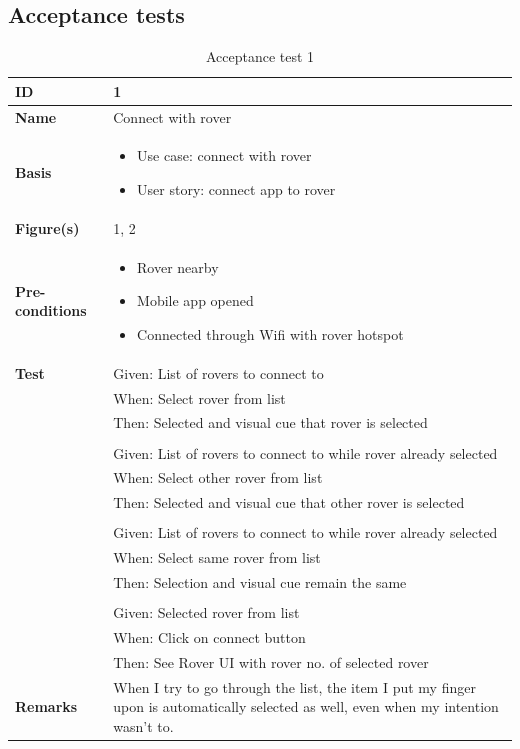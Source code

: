 \documentclass[12pt]{article}
\begin{document}
	\subsection{Acceptance tests}
	\begin{table}[H]
		\centering
		\begin{tabularx}{\linewidth}{|X|X|}
			\hline
			\textbf{ID} &1\\
			\hline
			\textbf{Name} &Connect with rover\\
			\hline
			\textbf{Basis} &\begin{itemize}
								\item Use case: connect with rover
								\item User story: connect app to rover
							\end{itemize}\\
			\hline
			\textbf{Figure(s)} &1, 2 \\
			\hline
			\textbf{Pre-conditions} & \begin{itemize}
									  	\item Rover nearby
									  	\item Mobile app opened
									  	\item Connected through Wifi with rover hotspot
									  \end{itemize}\\
			\hline
			\textbf{Test} &Given: List of rovers to connect to\\
						&When: Select rover from list\\
						&Then: Selected and visual cue that rover is selected\\
						&\\
						&Given: List of rovers to connect to while rover already selected\\
						&When: Select other rover from list\\
						&Then: Selected and visual cue that other rover is selected\\
						&\\
						&Given: List of rovers to connect to while rover already selected\\
						&When: Select same rover from list\\
						&Then: Selection and visual cue remain the same\\
						&\\
						&Given: Selected rover from list\\
						&When: Click on connect button\\
						&Then: See Rover UI with rover no. of selected rover\\
			\hline
			\textbf{Remarks} &When I try to go through the list, the item I put my finger upon is automatically selected as well, even when my intention wasn't to.\\
			\hline
		\end{tabularx}
		\caption{Acceptance test 1}
		\label{table:Acceptance test 1}   
	\end{table}
\end{document}

